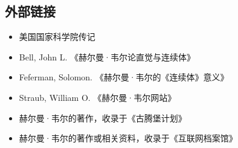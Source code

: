 \subsection{外部链接}
\begin{itemize}
\item 美国国家科学院传记
\item Bell, John L. 《赫尔曼·韦尔论直觉与连续体》
\item Feferman, Solomon. 《赫尔曼·韦尔的《连续体》意义》
\item Straub, William O. 《赫尔曼·韦尔网站》
\item 赫尔曼·韦尔的著作，收录于《古腾堡计划》
\item 赫尔曼·韦尔的著作或相关资料，收录于《互联网档案馆》
\end{itemize}